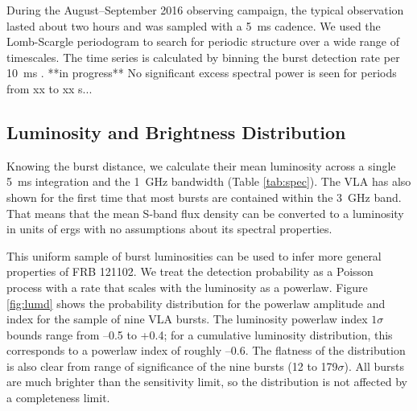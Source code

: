 \documentclass[twocolumn]{aastex61}
\newcommand{\frb}{FRB 121102}
\begin{document}
During the August--September 2016 observing campaign, the typical observation lasted about two hours and was sampled with a 5~ms cadence. We used the Lomb-Scargle periodogram \citep{1982ApJ...263..835S} to search for periodic structure over a wide range of timescales. The time series is calculated by binning the burst detection rate per 10~ms \citep[i.e., 0 or 1, see also]{2011MNRAS.417.1871P}. 
**in progress**
No significant excess spectral power is seen for periods from xx to xx s... 

\subsection{Luminosity and Brightness Distribution}
\label{sec:disn}
Knowing the burst distance, we calculate their mean luminosity across a single 5~ms integration and the 1~GHz bandwidth (Table \ref{tab:spec}). The VLA has also shown for the first time that most bursts are contained within the 3~GHz band. That means that the mean S-band flux density can be converted to a luminosity in units of ergs with no assumptions about its spectral properties.

This uniform sample of burst luminosities can be used to infer more general properties of \frb. We treat the detection probability as a Poisson process with a rate that scales with the luminosity as a powerlaw. Figure \ref{fig:lumd} shows the probability distribution for the powerlaw amplitude and index for the sample of nine VLA bursts. The luminosity powerlaw index $1\sigma$ bounds range from --0.5 to +0.4; for a cumulative luminosity distribution, this corresponds to a powerlaw index of roughly --0.6. The flatness of the distribution is also clear from range of significance of the nine bursts (12 to 179$\sigma$). All bursts are much brighter than the sensitivity limit, so the distribution is not affected by a completeness limit.
\end{document}
